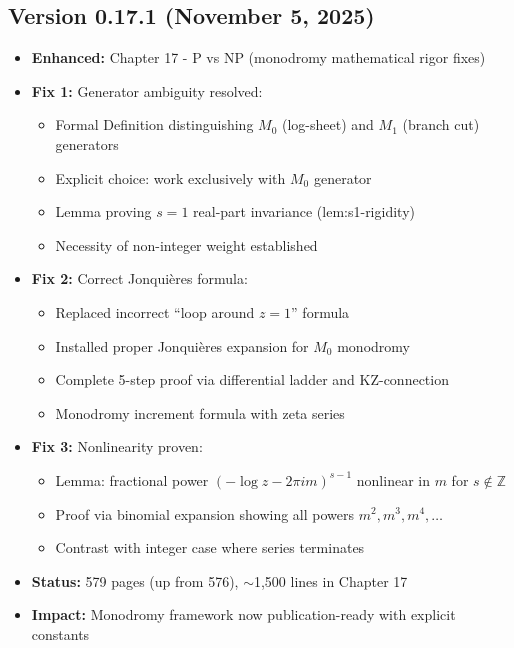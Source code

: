 \subsection*{Version 0.17.1 (November 5, 2025)}
\begin{itemize}
\item \textbf{Enhanced:} Chapter 17 - P vs NP (monodromy mathematical rigor fixes)
\item \textbf{Fix 1:} Generator ambiguity resolved:
  \begin{itemize}
  \item Formal Definition distinguishing $M_0$ (log-sheet) and $M_1$ (branch cut) generators
  \item Explicit choice: work exclusively with $M_0$ generator
  \item Lemma proving $s=1$ real-part invariance (lem:s1-rigidity)
  \item Necessity of non-integer weight established
  \end{itemize}
\item \textbf{Fix 2:} Correct Jonquières formula:
  \begin{itemize}
  \item Replaced incorrect ``loop around $z=1$'' formula
  \item Installed proper Jonquières expansion for $M_0$ monodromy
  \item Complete 5-step proof via differential ladder and KZ-connection
  \item Monodromy increment formula with zeta series
  \end{itemize}
\item \textbf{Fix 3:} Nonlinearity proven:
  \begin{itemize}
  \item Lemma: fractional power $(- \log z - 2\pi im)^{s-1}$ nonlinear in $m$ for $s\notin\mathbb{Z}$
  \item Proof via binomial expansion showing all powers $m^2, m^3, m^4, \ldots$
  \item Contrast with integer case where series terminates
  \end{itemize}
\item \textbf{Status:} 579 pages (up from 576), $\sim$1,500 lines in Chapter 17
\item \textbf{Impact:} Monodromy framework now publication-ready with explicit constants
\end{itemize}

